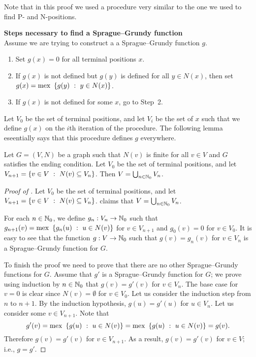 Note that in this proof we used a procedure very similar to the one we used to
find P- and N-positions.
\begin{template}
  \textbf{Steps necessary to find a Sprague--Grundy function} \\

  Assume we are trying to construct a a Sprague--Grundy function $g$.
  \begin{enumerate}
    \item Set $g(x) = 0$ for all terminal positions $x$.
    \item If $g(x)$ is not defined but $g(y)$ is defined for all $y \in N(x)$,
      then set $g(x) = \mex \set[y \in N(x)]{g(y)}$.
    \item If $g(x)$ is not defined for some $x$, go to Step~2.
  \end{enumerate}
\end{template}

Let $V_0$ be the set of terminal positions, and let $V_i$ be the set of $x$ such
that we define $g(x)$ on the $i$th iteration of the procedure.
The following lemma eseentially says that this procedure defines $g$ everywhere.
\begin{lemma}[K\H{o}nig]
\label{lemma:konig}
  Let $G = (V, N)$ be a graph such that $N(v)$ is finite for all $v \in V$ and
  $G$ satisfies the ending condition.
  Let $V_0$ be the set of terminal positions, and let $V_{n + 1} = 
  \set[N(v) \subseteq V_n]{v \in V}$. Then $V = \bigcup_{n \in {\mathbb{N}}_0} V_n$.
\end{lemma}

\begin{proof}[Proof of ]
  Let $V_0$ be the set of terminal positions, and let $V_{n + 1} = 
  \set[N(v) \subseteq V_n]{v \in V}$.
   claims that $V = \bigcup_{n \in {\mathbb{N}}_0} V_n$.

  For each $n \in {\mathbb{N}}_0$, we define $g_n : V_n \to {\mathbb{N}}_0$ such that 
  $
    g_{n + 1}(v) = \mex \set[u \in N(v)]{g_n(u)}
  $
  for $v \in V_{n + 1}$ and $g_0(v) = 0$ for $v \in V_0$. It is easy to see
  that the function $g : V \to {\mathbb{N}}_0$ such that $g(v) = g_n(v)$ for $v \in V_n$
  is a Sprague--Grundy function for $G$. 

  To finish the proof we need to prove that there are no other Sprague--Grundy
  functions for $G$. Assume that $g'$ is a Sprague--Grundy function for
  $G$; we prove using induction by $n \in {\mathbb{N}}_0$ that $g(v) = g'(v)$ for 
  $v \in V_n$. The base case for $v = 0$ is clear since $N(v) = \emptyset$ for
  $v \in V_0$. Let us consider the induction step from $n$ to $n + 1$. By the
  induction hypothesis, $g(u) = g'(u)$ for $u \in V_n$. Let us consider some $v
  \in V_{n + 1}$. Note that 
  \[
    g'(v) = \mex \set[u \in N(v)]{g(u)} = \mex \set[u \in N(v)]{g(u)} = g(v).
  \]
  Therefore $g(v) = g'(v)$ for $v \in V_{n + 1}$. As a result, $g(v) = g'(v)$
  for $v \in V$; i.e., $g = g'$.
\end{proof}

